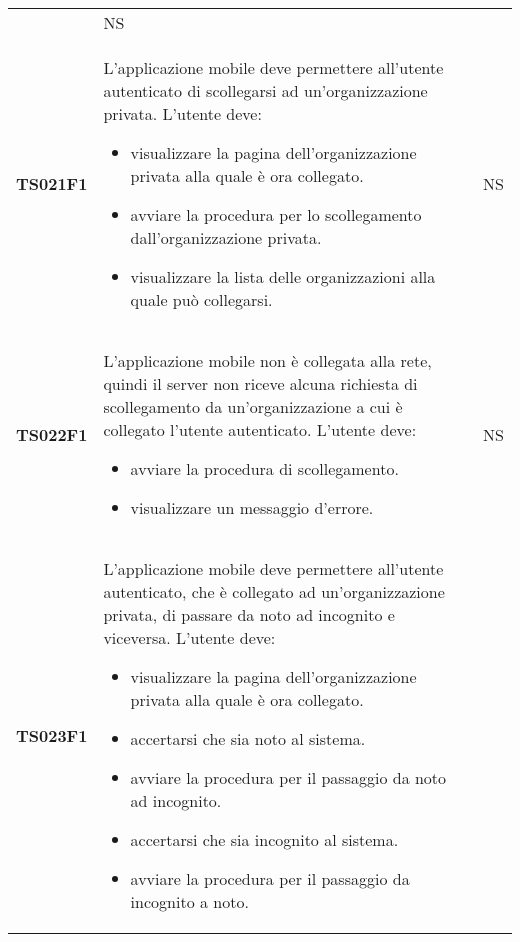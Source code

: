 \documentclass[../piano-di-qualifica.tex]{subfiles}
\begin{document}
\begin{centering}
\begin{longtable}[H]{>{\centering\bfseries}m{3cm} >{}p{10cm} >{\centering\arraybackslash}m{3cm}}
\begin{itemize}
                        \end{itemize}
                    & NS \\
        TS021F1     & L'applicazione mobile deve permettere all'utente autenticato di scollegarsi ad un'organizzazione privata. \newline
                      L'utente deve:
                        \begin{itemize}
                          \item visualizzare la pagina dell'organizzazione privata alla quale è ora collegato.
                          \item avviare la procedura per lo scollegamento dall'organizzazione privata.
                          \item visualizzare la lista delle organizzazioni alla quale può collegarsi.
                        \end{itemize}
                    & NS \\
        TS022F1     & L'applicazione mobile non è collegata alla rete, quindi il server non riceve alcuna richiesta di scollegamento da un'organizzazione a cui è collegato l'utente autenticato. \newline
                      L'utente deve:
                        \begin{itemize}
                          \item avviare la procedura di scollegamento.
                          \item visualizzare un messaggio d'errore.
                        \end{itemize}
                    & NS \\
        TS023F1     & L'applicazione mobile deve permettere all'utente autenticato, che è collegato ad un'organizzazione privata, di passare da noto ad incognito e viceversa. \newline
                      L'utente deve:
                        \begin{itemize}
                          \item visualizzare la pagina dell'organizzazione privata alla quale è ora collegato.
                          \item accertarsi che sia noto al sistema.
                          \item avviare la procedura per il passaggio da noto ad incognito.
                          \item accertarsi che sia incognito al sistema.
                          \item avviare la procedura per il passaggio da incognito a noto.

\end{itemize}
\end{longtable}
\end{centering}
\end{document}
